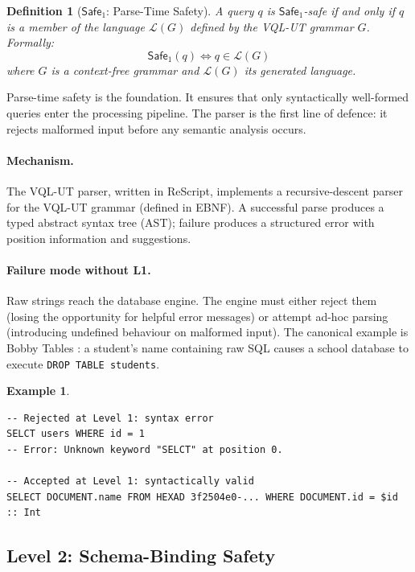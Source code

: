 \documentclass[11pt,a4paper]{article}
\newtheorem{definition}[theorem]{Definition}
\newtheorem{example}[theorem]{Example}
\newcommand{\VQL}{\textsc{VQL-UT}}
\newcommand{\LevelN}[1]{\textsf{L#1}}
\newcommand{\Safe}[1]{\ensuremath{\mathsf{Safe}_{#1}}}
\begin{document}
\begin{definition}[\Safe{1}: Parse-Time Safety]
A query $q$ is \Safe{1}-safe if and only if $q$ is a member of the
language $\mathcal{L}(G)$ defined by the VQL-UT grammar $G$.
Formally:
\[
  \Safe{1}(q) \iff q \in \mathcal{L}(G)
\]
where $G$ is a context-free grammar and $\mathcal{L}(G)$ its generated
language.
\end{definition}

Parse-time safety is the foundation.  It ensures that only
syntactically well-formed queries enter the processing pipeline.
The parser is the first line of defence: it rejects malformed input
before any semantic analysis occurs.

\paragraph{Mechanism.}
The \VQL{} parser, written in ReScript, implements a recursive-descent
parser for the VQL-UT grammar (defined in EBNF).  A successful parse
produces a typed abstract syntax tree (AST); failure produces a
structured error with position information and suggestions.

\paragraph{Failure mode without \LevelN{1}.}
Raw strings reach the database engine.  The engine must either reject
them (losing the opportunity for helpful error messages) or attempt
ad-hoc parsing (introducing undefined behaviour on malformed input).
The canonical example is Bobby Tables \citep{xkcd327}: a student's
name containing raw SQL causes a school database to execute
\texttt{DROP TABLE students}.

\begin{example}
\begin{lstlisting}[language=VQL]
-- Rejected at Level 1: syntax error
SELCT users WHERE id = 1
-- Error: Unknown keyword "SELCT" at position 0.

-- Accepted at Level 1: syntactically valid
SELECT DOCUMENT.name FROM HEXAD 3f2504e0-... WHERE DOCUMENT.id = $id :: Int
\end{lstlisting}
\end{example}

\subsection{Level 2: Schema-Binding Safety}\label{sec:L2}
\end{document}
